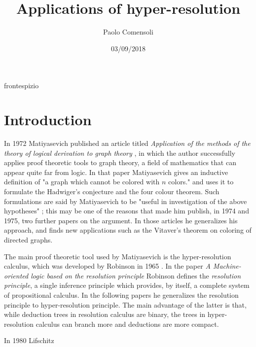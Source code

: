 \documentclass[a4paper,12pt,oneside]{book}
\title{Applications of hyper-resolution}
\author{Paolo Comensoli}
\date{03/09/2018}
\begin{document}
 
 {frontespizio} %

\setlength{\parskip}{-0.7mm} 
\tableofcontents
\thispagestyle{empty}
\newpage
\setlength{\parskip}{1mm} 


\chapter*{Introduction}
In 1972 Matiyasevich published an article titled \textit{Application of the methods of the theory of logical derivation to graph theory} \cite{mat-2}, in which the author successfully applies proof theoretic tools to graph theory, a field of mathematics that can appear quite far from logic. In that paper Matiyasevich  gives an inductive definition of "a graph which cannot be colored with $n$ colors." and uses it to formulate  the Hadwiger's conjecture and the four colour theorem. Such formulations are said by  Matiyasevich to be "useful in investigation of the above hypotheses" \cite{mat-2}; this may be one of the reasons that made him publish, in 1974 and 1975, two further papers \cite{mat-3,mat-1} on the argument. In those articles he generalizes his approach, and finds new applications such as the Vitaver's theorem on coloring of directed graphs.

The main proof theoretic tool used by Matiyasevich is the hyper-resolution calculus, which was developed by Robinson in 1965 \cite{robinson,rob,robinson-general}. In the paper \textit{A Machine-oriented logic based on the resolution principle} \cite{robinson} Robinson defines the \textit{resolution principle}, a single inference principle which provides, by itself, a complete system of propositional calculus.  In the following papers  \cite{rob,robinson-general} he generalizes the resolution principle to hyper-resolution principle. The main advantage of the latter  is that, while deduction trees in resolution calculus are binary, the trees in hyper-resolution calculus can branch more  and deductions are more compact.

In 1980 Lifschitz 
\end{document}
